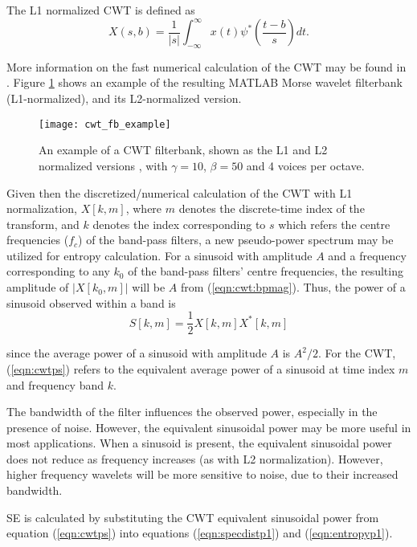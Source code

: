 The L1 normalized CWT is defined as
\begin{equation}
	X(s,b) = \frac{1}{|s|} \int_{-\infty}^{\infty} x(t) \psi^*\left(\frac{t-b}{s}\right) dt.
\end{equation}




More information on the fast numerical calculation of the CWT may be found in \citep{fcwt}. Figure \ref{fig:cwt_fb_example} shows an example of the resulting MATLAB Morse wavelet filterbank (L1-normalized), and its L2-normalized version.

\begin{figure}[t]
	\centering
	\texttt{[image: cwt\_fb\_example]}
	\caption[An example of a CWT filterbank.]{An example of a CWT filterbank, shown as the L1 and L2 normalized versions , with $\gamma = 10$, $\beta=50$ and 4 voices per octave.}
	\label{fig:cwt_fb_example}
\end{figure}

Given then the discretized/numerical calculation of the CWT with L1 normalization, $X[k,m]$, where $m$ denotes the discrete-time index of the transform, and $k$ denotes the index corresponding to $s$ which refers the centre frequencies ($f_c$) of the band-pass filters, a new pseudo-power spectrum may be utilized for entropy calculation. For a sinusoid with amplitude $A$ and a frequency corresponding to any $k_0$ of the band-pass filters' centre frequencies, the resulting amplitude of $|X[k_0,m]|$ will be $A$ from (\ref{eqn:cwt:bpmag}). Thus, the power of a sinusoid observed within a band is
\begin{equation}
	\label{eqn:cwtps}
	S[k,m] = \frac{1}{2} X[k,m] X^*[k,m]
\end{equation}

\noindent since the average power of a sinusoid with amplitude $A$ is $A^2/2$. For the CWT, (\ref{eqn:cwtps}) refers to the equivalent average power of a sinusoid at time index $m$ and frequency band $k$.

The bandwidth of the filter influences the observed power, especially in the presence of noise. However, the equivalent sinusoidal power may be more useful in most applications. When a sinusoid is present, the equivalent sinusoidal power does not reduce as frequency increases (as with L2 normalization). However, higher frequency wavelets will be more sensitive to noise, due to their increased bandwidth.

SE is calculated by substituting the CWT equivalent sinusoidal power from equation (\ref{eqn:cwtps}) into equations (\ref{eqn:specdistp1}) and (\ref{eqn:entropyp1}).

